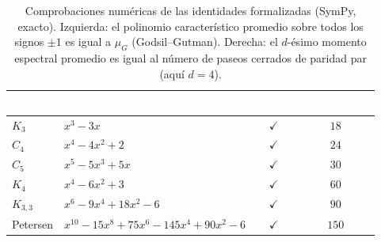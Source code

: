 \begin{table}[t]
  \centering
  \small
  \caption{Comprobaciones numéricas de las identidades formalizadas (SymPy,
  exacto). Izquierda: el polinomio característico promedio sobre todos los signos
  $\pm1$ es igual a $\mu_G$ (Godsil--Gutman). Derecha: el $d$-ésimo momento
  espectral promedio es igual al número de paseos cerrados de paridad par (aquí
  $d=4$).}
  \label{tab:checks}
  \begin{tabular}{@{}llcc@{}}
    \toprule
    \rowcolor{ggteal}
    \textcolor{white}{\textbf{$G$}} & \textcolor{white}{\textbf{$2^{-|E|}\!\sum_{\mathrm{signos}}\det(xI-A_s)$}} & \textcolor{white}{\textbf{$=\mu_G$?}} & \textcolor{white}{\textbf{$\overline{\mathrm{tr}(A_s^{4})}=P_4$}} \\
    \midrule
    \rowcolor{ggband}
    $K_3$ & $x^{3}-3x$         & $\checkmark$ & $18$ \\
    $C_4$ & $x^{4}-4x^{2}+2$   & $\checkmark$ & $24$ \\
    \rowcolor{ggband}
    $C_5$ & $x^{5}-5x^{3}+5x$  & $\checkmark$ & $30$ \\
    $K_4$ & $x^{4}-6x^{2}+3$   & $\checkmark$ & $60$ \\
    \rowcolor{ggband}
    $K_{3,3}$ & $x^{6}-9x^{4}+18x^{2}-6$ & $\checkmark$ & $90$ \\
    Petersen & $x^{10}-15x^{8}+75x^{6}-145x^{4}+90x^{2}-6$ & $\checkmark$ & $150$ \\
    \bottomrule
  \end{tabular}
\end{table}
